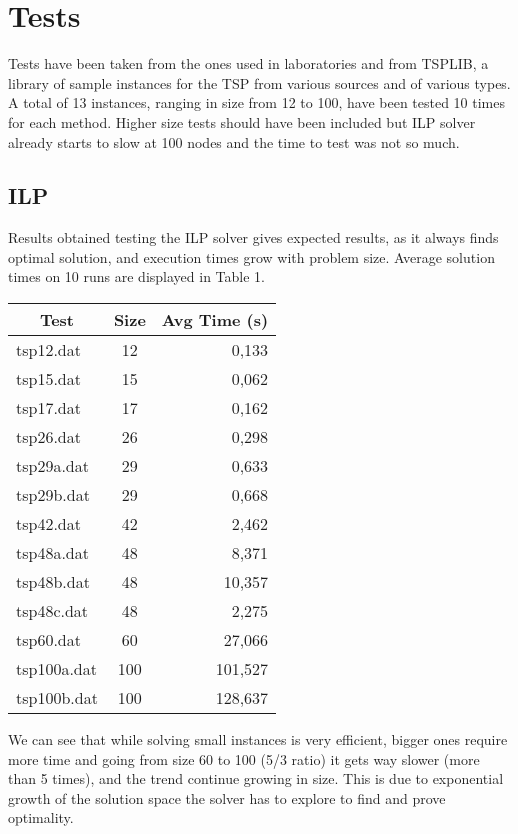 \section{Tests}
	Tests have been taken from the ones used in laboratories and from TSPLIB, a library of sample instances for the TSP from various sources and of various types. A total of 13 instances, ranging in size from 12 to 100, have been tested 10 times for each method. Higher size tests should have been included but ILP solver already starts to slow at 100 nodes and the time to test was not so much.
	
	\subsection{ILP}
		Results obtained testing the ILP solver gives expected results, as it always finds optimal solution, and execution times grow with problem size. Average solution times on 10 runs are displayed in Table 1.\\
		
		\begin{center}
			\begin{tabular}{ | l | c | r | }
				\hline
				\multicolumn{1}{|c|}{Test} & Size & \multicolumn{1}{|c|}{Avg Time (s)}\\
				\hline
				tsp12.dat		& 12		& 0,133\\
				tsp15.dat		& 15		& 0,062\\
				tsp17.dat		& 17		& 0,162\\
				tsp26.dat		& 26		& 0,298\\
				tsp29a.dat		& 29		& 0,633\\
				tsp29b.dat		& 29		& 0,668\\
				tsp42.dat		& 42		& 2,462\\
				tsp48a.dat		& 48		& 8,371\\
				tsp48b.dat		& 48		& 10,357\\
				tsp48c.dat		& 48		& 2,275\\
				tsp60.dat		& 60		& 27,066\\
				tsp100a.dat	& 100	& 101,527\\
				tsp100b.dat	& 100	& 128,637\\
				\hline
			\end{tabular}
		\end{center}
		\vspace{1em}
		We can see that while solving small instances is very efficient, bigger ones require more time and going from size 60 to 100 (5/3 ratio) it gets way slower (more than 5 times), and the trend continue growing in size. This is due to exponential growth of the solution space the solver has to explore to find and prove optimality.
		
